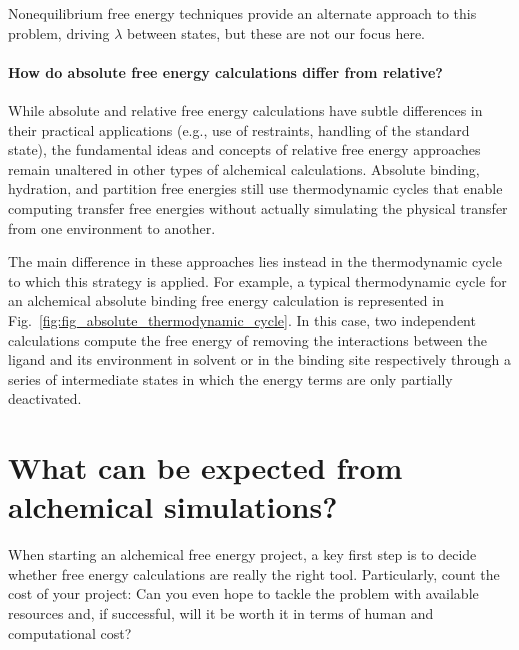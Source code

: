 \documentclass[9pt,bestpractices]{livecoms}
\begin{document}
Nonequilibrium free energy techniques provide an alternate approach to this problem, driving $\lambda$ between states, but these are not our focus here.~\cite{jarzynski1997nonequilibrium,jarzynski1998equilibrium,crooks2000pathensemble, gapsys2020large}

\paragraph{How do absolute free energy calculations differ from relative?}

While absolute and relative free energy calculations have subtle differences in their practical applications (e.g., use of restraints, handling of the standard state), the fundamental ideas and concepts of relative free energy approaches remain unaltered in other types of alchemical calculations.
Absolute binding, hydration, and partition free energies still use thermodynamic cycles that enable computing transfer free energies without actually simulating the physical transfer from one environment to another.

The main difference in these approaches lies instead in the thermodynamic cycle to which this strategy is applied.
For example, a typical thermodynamic cycle for an alchemical absolute binding free energy calculation is represented in Fig.~\ref{fig:fig_absolute_thermodynamic_cycle}.
In this case, two independent calculations compute the free energy of removing the interactions between the ligand and its environment in solvent or in the binding site respectively through a series of intermediate states in which the energy terms are only partially deactivated.




\section{What can be expected from alchemical simulations?}
\label{sec:step0}
When starting an alchemical free energy project, a key first step is to decide whether free energy calculations are really the right tool. Particularly, count the cost of your
project: Can you even hope to tackle the problem with available resources and, if successful, will it
be worth it in terms of human and computational cost?
\end{document}
